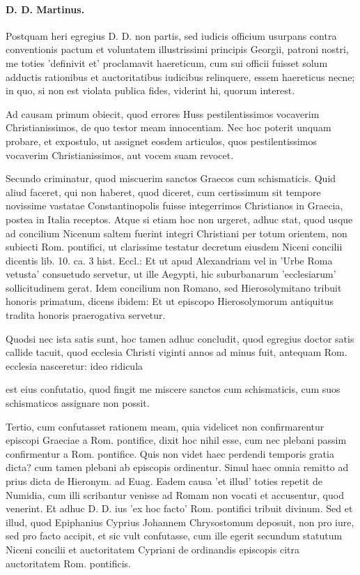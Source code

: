 \paragraph*{D. D. Martinus.}

Postquam heri egregius D. D. non partis, sed iudicis officium usurpans contra conventionis pactum et voluntatem illustrissimi principis Georgii, patroni nostri, me toties 'definivit et' proclamavit haereticum, cum sui officii fuisset solum adductis rationibus et auctoritatibus iudicibus relinquere, essem haereticus necne; in quo, si non est violata publica fides, viderint hi, quorum interest.

Ad causam primum obiecit, quod errores Huss pestilentissimos vocaverim Christianissimos, de quo testor meam innocentiam. Nec hoc poterit unquam probare, et expostulo, ut assignet eosdem articulos, quos pestilentissimos vocaverim Christianissimos, aut vocem suam revocet.

Secundo criminatur, quod miscuerim sanctos Graecos cum schismaticis. Quid aliud faceret, qui non haberet, quod diceret, cum certissimum sit tempore novissime vastatae Constantinopolis fuisse integerrimos Christianos in Graecia, postea in Italia receptos. Atque si etiam hoc non urgeret, adhuc stat, quod usque ad concilium Nicenum saltem fuerint integri Christiani per totum orientem, non subiecti Rom. pontifici, ut clarissime testatur decretum eiusdem Niceni concilii dicentis lib. 10. ca. 3 hist. Eccl.: Et ut apud Alexandriam vel in 'Urbe Roma vetusta' consuetudo servetur, ut ille Aegypti, hic suburbanarum 'ecclesiarum' sollicitudinem gerat. Idem concilium non Romano, sed Hierosolymitano tribuit honoris primatum, dicens ibidem: Et ut episcopo Hierosolymorum antiquitus tradita honoris praerogativa servetur.

Quodsi nec ista satis sunt, hoc tamen adhuc concludit, quod egregius doctor satis callide tacuit, quod ecclesia Christi viginti annos ad minus fuit, antequam Rom. ecclesia nasceretur: ideo ridicula

est eius confutatio, quod fingit me miscere sanctos cum schismaticis, cum suos schismaticos assignare non possit.

Tertio, cum confutasset rationem meam, quia videlicet non confirmarentur episcopi Graeciae a Rom. pontifice, dixit hoc nihil esse, cum nec plebani passim confirmentur a Rom. pontifice. Quis non videt haec perdendi temporis gratia dicta? cum tamen plebani ab episcopis ordinentur. Simul haec omnia remitto ad prius dicta de Hieronym. ad Euag. Eadem causa 'et illud' toties repetit de Numidia, cum illi scribantur venisse ad Romam non vocati et accusentur, quod venerint. Et adhuc D. D. ius 'ex hoc facto' Rom. pontifici tribuit divinum. Sed et illud, quod Epiphanius Cyprius Johannem Chrysostomum deposuit, non pro iure, sed pro facto accipit, et sic vult confutasse, \marginpar{\small[286]} cum ille egerit secundum statutum Niceni concilii et auctoritatem Cypriani de ordinandis episcopis citra auctoritatem Rom. pontificis.

